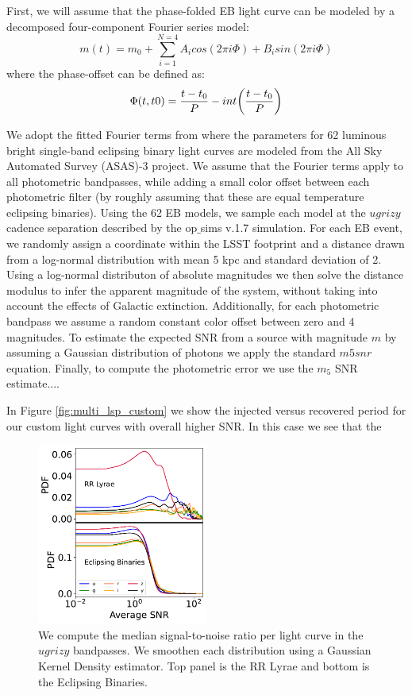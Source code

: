 \documentclass[DM,authoryear,toc]{lsstdoc}
\begin{document}
First, we will assume that the phase-folded EB light curve can be modeled by a decomposed four-component Fourier series model:
\begin{equation}
m(t) = m_0 + \sum_{i=1}^{N=4} A_icos(2\pi i\Phi) + B_isin(2\pi i \Phi)
\end{equation}
where the phase-offset can be defined as:
\begin{equation}
\Phi(t,t0) = \frac{t-t_{0}}{P}-int\bigg{(}\frac{t-t_{0}}{P} \bigg{)}
\end{equation}

We adopt the fitted Fourier terms from \citet{Deb:Deb11} where the parameters for 62 luminous bright single-band eclipsing binary light curves are modeled from the All Sky Automated Survey
(ASAS)-3 project. We assume that the Fourier terms apply to all photometric bandpasses, while adding a small color offset between each photometric filter (by roughly assuming that these are equal temperature eclipsing binaries). Using the 62 EB models, we sample each model at the $ugrizy$ cadence separation described by the op$\_$sims v.1.7 simulation. For each EB event, we randomly assign a coordinate within the LSST footprint and a distance drawn from a log-normal distribution with mean 5 kpc and standard deviation of 2. Using a log-normal distributon of absolute magnitudes we then solve the distance modulus to infer the apparent magnitude of the system, without taking into account the effects of Galactic extinction. Additionally, for each photometric bandpass we assume a random constant color offset between zero and 4 magnitudes. To estimate the expected SNR from a source with magnitude $m$ by assuming a Gaussian distribution of photons we apply the standard $m5snr$ equation. Finally, to compute the photometric error we use the $m_5$ SNR estimate....


In Figure \ref{fig:multi_lsp_custom} we show the injected versus recovered period for our custom light curves with overall higher SNR. In this case we see that the 

\begin{figure}
  \includegraphics[width=0.5\textwidth]{figures/snr_average.pdf}
  \centering 
  \caption{We compute the median signal-to-noise ratio per light curve in the $ugrizy$ bandpasses.  We smoothen each distribution using a Gaussian Kernel Density estimator. Top panel is the RR Lyrae and bottom is the Eclipsing Binaries. }
  \label{fig:snr_average}
\end{figure}
\end{document}
